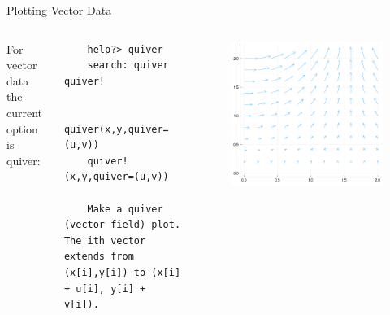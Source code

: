 \documentclass{beamer}
\begin{document}
\begin{frame}[fragile]{Plotting Vector Data}
	\begin{columns}
	For vector data the current option is quiver:
	\begin{lstlisting}
	help?> quiver
	search: quiver quiver!
	
	quiver(x,y,quiver=(u,v))
	quiver!(x,y,quiver=(u,v))
	
	Make a quiver (vector field) plot. The ith vector extends from (x[i],y[i]) to (x[i] + u[i], y[i] + v[i]).
	\end{lstlisting}
	\begin{figure}
		\centering
		\includegraphics[width=\textwidth]{quiver}
	\end{figure}
\end{columns}

\end{frame}
\end{document}

